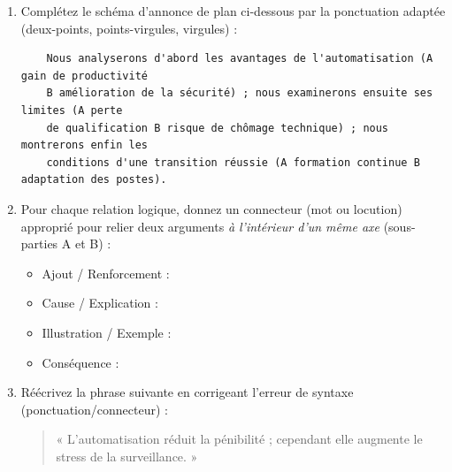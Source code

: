 \documentclass[11pt]{article}
\begin{document}
\begin{exercice}
\begin{enumerate}
    \item Complétez le schéma d'annonce de plan ci-dessous par la ponctuation adaptée (deux-points, points-virgules, virgules) :
    \begin{verbatim}
    Nous analyserons d'abord les avantages de l'automatisation (A gain de productivité
    B amélioration de la sécurité) ; nous examinerons ensuite ses limites (A perte
    de qualification B risque de chômage technique) ; nous montrerons enfin les
    conditions d'une transition réussie (A formation continue B adaptation des postes).
    \end{verbatim}
    \item Pour chaque relation logique, donnez un connecteur (mot ou locution) approprié pour relier deux arguments \textit{à l'intérieur d'un même axe} (sous-parties A et B) :
    \begin{itemize}
        \item Ajout / Renforcement : \dotfill
        \item Cause / Explication : \dotfill
        \item Illustration / Exemple : \dotfill
        \item Conséquence : \dotfill
    \end{itemize}
    \item Réécrivez la phrase suivante en corrigeant l'erreur de syntaxe (ponctuation/connecteur) :
    \begin{quote}
    « L'automatisation réduit la pénibilité ; cependant elle augmente le stress de la surveillance. »
    \end{quote}
\end{enumerate}
\end{exercice}
\end{document}
